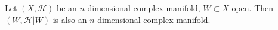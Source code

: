 Let $(X, \mathcal{H})$ be an $n$-dimensional complex manifold, $W \subset X$ open. Then $(W, \mathcal{H}|W)$ is also an $n$-dimensional complex manifold.
